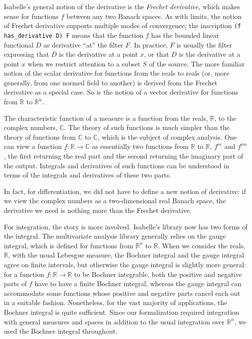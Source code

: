 \documentclass{svjour3}
\newcommand{\RR}{\mathbb{R}}
\newcommand{\CC}{\mathbb{C}}
\begin{document}
Isabelle's general notion of the derivative is the \emph{Frechet derivative}, which makes sense for functions $f$ between any two Banach spaces. As with limits, the notion of Frechet derivative supports multiple modes of convergence; the inscription \texttt{(f has\_derivative D) F} means that the function $f$ has the bounded linear functional $D$ as derivative ``at'' the filter $F$. In practice, $F$ is usually the filter expressing that $D$ is the derivative at a point $x$, or that $D$ is the derivative at a point $x$ when we restrict attention to a subset $S$ of the source. The more familiar notion of the scalar derivative for functions from the reals to reals (or, more generally, from one normed field to another) is derived from the Frechet derivative as a special case. So is the notion of a vector derivative for functions from $\RR$ to $\RR^n$.

The characteristic function of a measure is a function from the reals, $\RR$, to the complex numbers, $\CC$. The theory of such functions is much simpler than the theory of functions from $\CC$ to $\CC$, which is the subject of complex analysis. One can view a function $f : \RR \to \CC$ as essentially two functions from $\RR$ to $\RR$, $f^\mathit{re}$ and $f^\mathit{im}$, the first returning the real part and the second returning the imaginary part of the output. Integrals and derivatives of such functions can be understood in terms of the integrals and derivatives of these two parts.

In fact, for differentiation, we did not have to define a new notion of derivative: if we view the complex numbers as a two-dimensional real Banach space, the derivative we need is nothing more than the Frechet derivative. 

For integration, the story is more involved. Isabelle's library now has two forms of the integral. The multivariate analysis library generally relies on the gauge integral, which is defined for functions from $\RR^n$ to $\RR$. When we consider the reals, $\RR$, with the usual Lebesgue measure, the Bochner integral and the gauge integral agree on finite intervals, but otherwise the gauge integral is slightly more general: for a function $f : \RR \to \RR$ to be Bochner integrable, both the positive and negative parts of $f$ have to have a finite Bochner integral, whereas the gauge integral can accommodate some functions whose positive and negative parts cancel each out in a suitable fashion. Nonetheless, for the vast majority of applications, the Bochner integral is quite sufficient. Since our formalization required integration with general measures and spaces in addition to the usual integration over $\RR^n$, we used the Bochner integral throughout.
\end{document}
